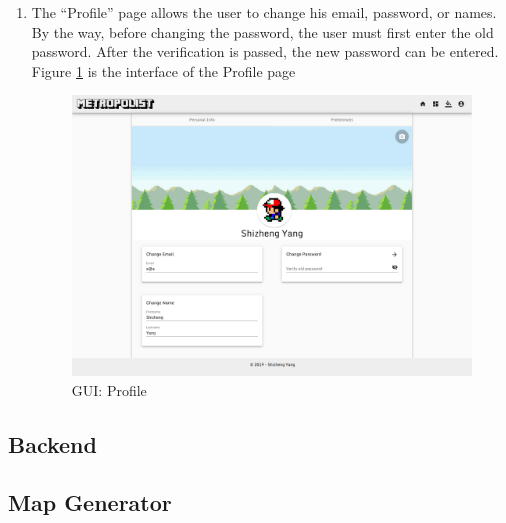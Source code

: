 \begin{enumerate}
  \item The ``Profile'' page allows the user to change his email, password, or names. By the way, before changing the password, the user must first enter the old password. After the verification is passed, the new password can be entered. Figure \ref{fig:GUI profile} is the interface of the Profile page

  \begin{figure}[htbp]
  \centering
  \includegraphics[width=\textwidth]{section04/assets/GUI-profile.png}
  \caption[GUI: Profile]{\label{fig:GUI profile}GUI: Profile}
  \end{figure}

\end{enumerate}

\subsection{Backend}

\subsection{Map Generator}
